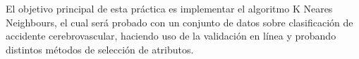 El objetivo principal de esta práctica es implementar el algoritmo K Neares Neighbours, el cual será probado con un conjunto de datos sobre clasificación de accidente cerebrovascular, haciendo uso de la validación en línea y probando distintos métodos de selección de atributos.

